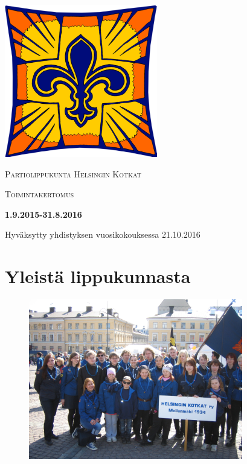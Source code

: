 \documentclass[a4paper, 12pt, finnish]{report} %
\begin{document}
\begin{titlepage}
	\centering
	\includegraphics[width=0.5\textwidth]{heko.png}\par\vspace{1cm}
	{\scshape\LARGE Partiolippukunta Helsingin Kotkat \par}
	\vspace{1cm}
	{\scshape\Large Toimintakertomus\par}
	\vspace{1.5cm}
	{\huge\bfseries 1.9.2015-31.8.2016\par}
	\vspace{2cm}
	\vfill
	\vfill
	{\large Hyväksytty yhdistyksen vuosikokouksessa 21.10.2016}
\end{titlepage}

\section{Yleistä lippukunnasta}
\begin{figure}[htb]
	\begin{center}
		\includegraphics[height=7cm]{paraatissa.jpg}
	\end{center}
	\captionsetup{labelformat=empty}
\end{figure}
\end{document}
